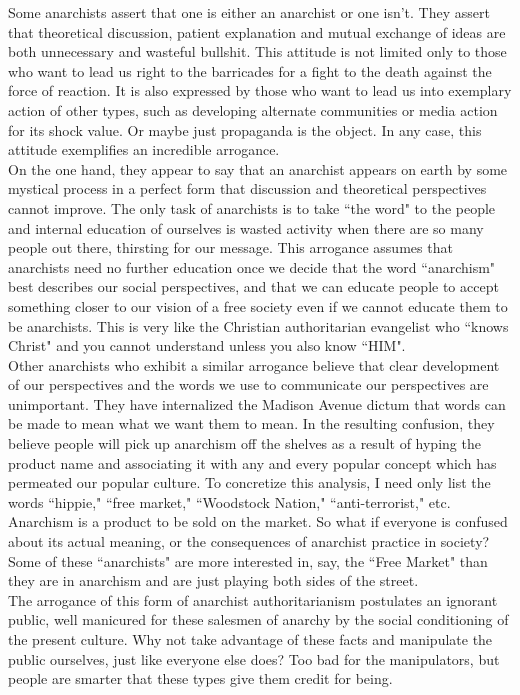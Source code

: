 \documentclass[12pt, onecolumn, letterpaper, oneside]{book}
\begin{document}
Some anarchists assert that one is either an anarchist or one isn't. They assert that theoretical discussion, patient explanation and mutual exchange of ideas are both unnecessary and wasteful bullshit. This attitude is not limited only to those who want to lead us right to the barricades for a fight to the death against the force of reaction. It is also expressed by those who want to lead us into exemplary action of other types, such as developing alternate communities or media action for its shock value. Or maybe just propaganda is the object. In any case, this attitude exemplifies an incredible arrogance.\\
On the one hand, they appear to say that an anarchist appears on earth by some mystical process in a perfect form that discussion and theoretical perspectives cannot improve. The only task of anarchists is to take ``the word" to the people and internal education of ourselves is wasted activity when there are so many people out there, thirsting for our message. This arrogance assumes that anarchists need no further education once we decide that the word ``anarchism" best describes our social perspectives, and that we can educate people to accept something closer to our vision of a free society even if we cannot educate them to be anarchists. This is very like the Christian authoritarian evangelist who ``knows Christ" and you cannot understand unless you also know ``HIM".\\
Other anarchists who exhibit a similar arrogance believe that clear development of our perspectives and the words we use to communicate our perspectives are unimportant. They have internalized the Madison Avenue dictum that words can be made to mean what we want them to mean. In the resulting confusion, they believe people will pick up anarchism off the shelves as a result of hyping the product name and associating it with any and every popular concept which has permeated our popular culture. To concretize this analysis, I need only list the words ``hippie," ``free market," ``Woodstock Nation," ``anti-terrorist," etc. Anarchism is a product to be sold on the market. So what if everyone is confused about its actual meaning, or the consequences of anarchist practice in society? Some of these ``anarchists" are more interested in, say, the ``Free Market" than they are in anarchism and are just playing both sides of the street.\\
The arrogance of this form of anarchist authoritarianism postulates an ignorant public, well manicured for these salesmen of anarchy by the social conditioning of the present culture. Why not take advantage of these facts and manipulate the public ourselves, just like everyone else does? Too bad for the manipulators, but people are smarter that these types give them credit for being.\\
\end{document}
